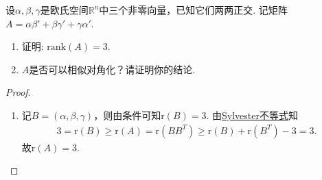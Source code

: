 \documentclass[../../main.tex]{subfiles}
\begin{document}
\begin{example}
设$\alpha,\beta,\gamma$是欧氏空间$\mathbb{R}^n$中三个非零向量，已知它们两两正交. 记矩阵$A = \alpha\beta' + \beta\gamma' + \gamma\alpha'$.
\begin{enumerate}[(1)]
\item 证明: $\text{rank}(A) = 3$.

\item $A$是否可以相似对角化？请证明你的结论.
\end{enumerate}
\end{example}
\begin{proof}
\begin{enumerate}[(1)]
\item 记$B=(\alpha,\beta,\gamma)$，则由条件可知$\text{r}(B)=3$. 由\hyperref[proposition:Sylvester(西尔维斯特)不等式]{Sylvester不等式}知
\begin{align*}
3=\text{r}(B)\geqslant \text{r}(A)=\text{r}(BB^T)\geqslant \text{r}(B)+\text{r}(B^T)-3=3.
\end{align*}
故$\text{r}(A)=3.$


\end{enumerate}
\end{proof}
\end{document}
